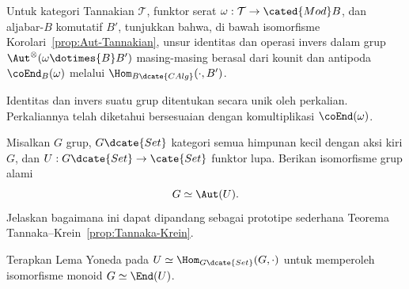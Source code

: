 \begin{Exercises}
	\item Untuk kategori Tannakian $\mathcal{T}$, funktor serat
	$\omega:\mathcal{T}\to\cated{Mod}B$, dan aljabar-$B$ komutatif $B'$,
	tunjukkan bahwa, di bawah isomorfisme
	Korolari~\ref{prop:Aut-Tannakian}, unsur identitas dan operasi invers
	dalam grup
	$\Aut^{\otimes}(\omega\dotimes{B}B')$ masing-masing berasal dari
	kounit dan antipoda $\coEnd_B(\omega)$ melalui
	$\Hom_{B\dcate{CAlg}}(\mathord\cdot,B')$.
	\begin{hint}
		Identitas dan invers suatu grup ditentukan secara unik oleh
		perkalian. Perkaliannya telah diketahui bersesuaian dengan
		komultiplikasi $\coEnd(\omega)$.
	\end{hint}

	\item Misalkan $G$ grup, $G\dcate{Set}$ kategori semua himpunan kecil
	dengan aksi kiri $G$, dan $U:G\dcate{Set}\to\cate{Set}$ funktor lupa.
	Berikan isomorfisme grup alami
	\[ G\simeq\Aut(U). \]
	Jelaskan bagaimana ini dapat dipandang sebagai prototipe sederhana
	Teorema Tannaka--Krein~\ref{prop:Tannaka-Krein}.
	\begin{hint}
		Terapkan Lema Yoneda pada
		$U\simeq\Hom_{G\dcate{Set}}(G,\mathord\cdot)$ untuk memperoleh
		isomorfisme monoid $G\simeq\End(U)$.
	\end{hint}
\end{Exercises}
